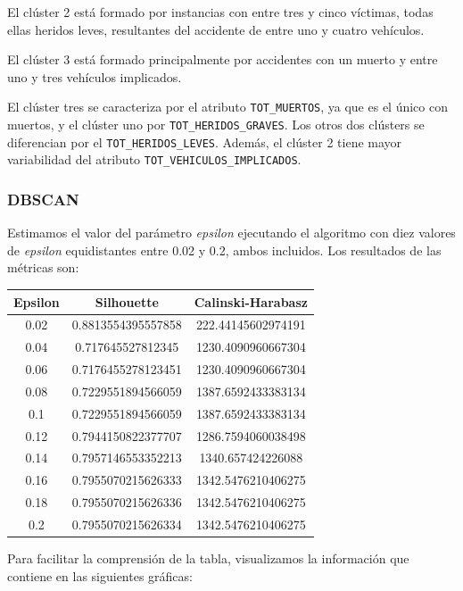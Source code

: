 \documentclass[a4]{article}
\begin{document}
El clúster 2 está formado por instancias con entre tres y cinco víctimas, todas ellas heridos leves, resultantes del accidente de entre uno y cuatro vehículos.

El clúster 3 está formado principalmente por accidentes con un muerto y entre uno y tres vehículos implicados.

El clúster tres se caracteriza por el atributo \texttt{TOT\_MUERTOS}, ya que es el único con muertos, y el clúster uno por \texttt{TOT\_HERIDOS\_GRAVES}. Los otros dos clústers se diferencian por el \texttt{TOT\_HERIDOS\_LEVES}. Además, el clúster 2 tiene mayor variabilidad del atributo \texttt{TOT\_VEHICULOS\_IMPLICADOS}.

\subsubsection{DBSCAN}

Estimamos el valor del parámetro \textit{epsilon} ejecutando el algoritmo con diez valores de \textit{epsilon} equidistantes entre 0.02 y 0.2, ambos incluidos. Los resultados de las métricas son:

\begin{center}
\begin{tabular}{|c|c|c|}
\hline
\multicolumn{1}{|c|}{\textbf{Epsilon}}& \textbf{Silhouette} & \textbf{Calinski-Harabasz}\\ \hline
  0.02 & 0.8813554395557858 & 222.44145602974191 \\ \hline
  0.04 & 0.717645527812345  & 1230.4090960667304 \\ \hline
  0.06 & 0.7176455278123451 & 1230.4090960667304 \\ \hline
  0.08 & 0.7229551894566059 & 1387.6592433383134 \\ \hline
  0.1  & 0.7229551894566059 & 1387.6592433383134 \\ \hline
  0.12 & 0.7944150822377707 & 1286.7594060038498 \\ \hline
  0.14 & 0.7957146553352213 & 1340.657424226088  \\ \hline
  0.16 & 0.7955070215626333 & 1342.5476210406275 \\ \hline
  0.18 & 0.7955070215626336 & 1342.5476210406275 \\ \hline
  0.2  & 0.7955070215626334 & 1342.5476210406275 \\ \hline
\end{tabular}
\end{center}

Para facilitar la comprensión de la tabla, visualizamos la información que contiene en las siguientes gráficas:
\end{document}
